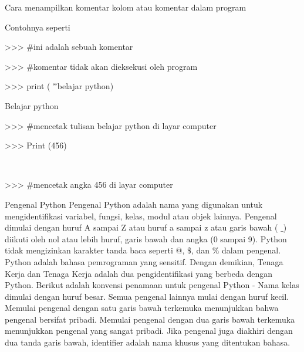 \documentclass[a4paper,12pt]{report}
\begin{document}
\vspace{14pt}
\noindent 
{\fontsize{14pt}{14pt}\selectfont Cara menampilkan komentar kolom atau komentar dalam program \\} \par
\vspace{14pt}
\noindent 
{\fontsize{14pt}{14pt}\selectfont Contohnya seperti  \\} \par
\vspace{14pt}
\noindent 
{\fontsize{14pt}{14pt}\selectfont >>>  $  \#  $ini adalah sebuah komentar \\} \par
\vspace{14pt}
\noindent 
{\fontsize{14pt}{14pt}\selectfont >>> $  \#  $komentar tidak akan dieksekusi oleh program \\} \par
\vspace{14pt}
\noindent 
{\fontsize{14pt}{14pt}\selectfont >>> print ( $ " $belajar python) \\} \par
\vspace{14pt}
\noindent 
{\fontsize{14pt}{14pt}\selectfont Belajar python \\} \par
\vspace{14pt}
\noindent 
{\fontsize{14pt}{14pt}\selectfont >>> $  \#  $mencetak tulisan belajar python di layar computer \\} \par
\noindent 
{\fontsize{14pt}{14pt}\selectfont >>> Print (456) \\} \par
\noindent 
{\fontsize{14pt}{14pt} \\} \par
\noindent 
{\fontsize{14pt}{14pt}\selectfont >>> $  \#  $mencetak angka 456 di layar computer \\} \par
\vspace{14pt}
\vspace{14pt}
\vspace{14pt}
\noindent 
{\fontsize{14pt}{14pt}\selectfont Pengenal Python Pengenal Python adalah nama yang digunakan untuk mengidentifikasi variabel, fungsi, kelas, modul atau objek lainnya. Pengenal dimulai dengan huruf A sampai Z atau huruf a sampai z atau garis bawah ( $  \_  $) diikuti oleh nol atau lebih huruf, garis bawah dan angka (0 sampai 9). Python tidak mengizinkan karakter tanda baca seperti @,  $  \$  $, dan $  \%  $ dalam pengenal. Python adalah bahasa pemrograman yang sensitif. Dengan demikian, Tenaga Kerja dan Tenaga Kerja adalah dua pengidentifikasi yang berbeda dengan Python. Berikut adalah konvensi penamaan untuk pengenal Python - Nama kelas dimulai dengan huruf besar. Semua pengenal lainnya mulai dengan huruf kecil. Memulai pengenal dengan satu garis bawah terkemuka menunjukkan bahwa pengenal bersifat pribadi. Memulai pengenal dengan dua garis bawah terkemuka menunjukkan pengenal yang sangat pribadi. Jika pengenal juga diakhiri dengan dua tanda garis bawah, identifier adalah nama khusus yang ditentukan bahasa. \\} \par
\end{document}
